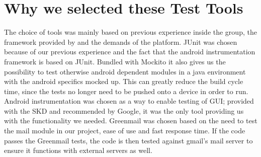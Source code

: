 \section{Why we selected these Test Tools}
The choice of tools was mainly based on previous experience inside the group, the framework provided by and the demands of the platform. 
\newline
\newline
JUnit was chosen because of our previous experience and the fact that the android instrumentation framework is based on JUnit. Bundled with Mockito it also gives us the possibility to test otherwise android dependent modules in a java environment with the android specifics mocked up. This can greatly reduce the build cycle time, since the tests no longer need to be pushed onto a device in order to run. 
\newline
\newline
Android instrumentation was chosen as a way to enable testing of GUI; provided with the SKD and recommended by Google, it was the only tool providing us with the functionality we needed.
\newline
\newline
Greenmail was chosen based on the need to test the mail module in our project, ease of use and fast response time. If the code passes the Greenmail tests, the code is then tested against gmail’s mail server to ensure it functions with external servers as well. 
